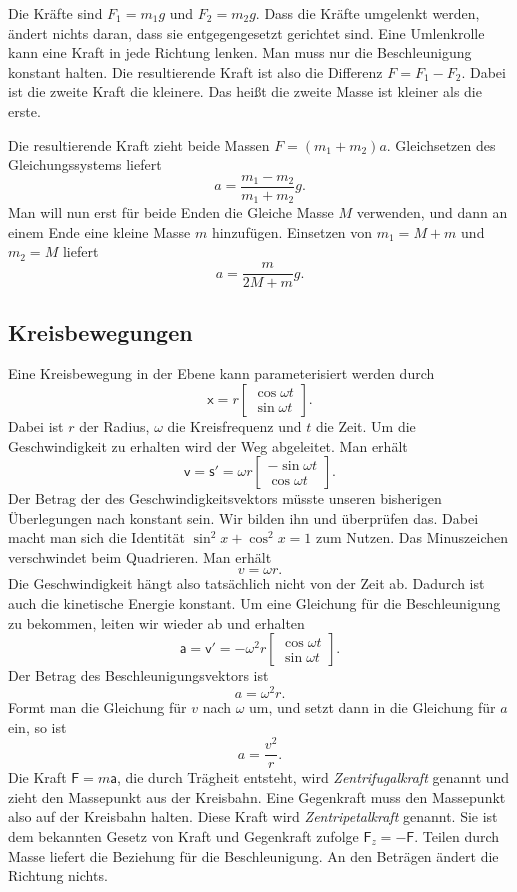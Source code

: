 \documentclass[a4paper,11pt,fleqn,twocolumn,twoside,dvipdfmx]{scrartcl}
\newcommand{\bvec}[1]{\bm{\mathsf{#1}}}
\begin{document}
Die Kräfte sind $F_1 = {m_1}g$ und $F_2 = {m_2}g$. Dass die Kräfte
umgelenkt werden, ändert nichts daran, dass sie entgegengesetzt
gerichtet sind. Eine Umlenkrolle kann eine Kraft in jede Richtung
lenken. Man muss nur die Beschleunigung konstant halten. Die
resultierende Kraft ist also die Differenz $F=F_1-F_2$.
Dabei ist die zweite Kraft die kleinere. Das heißt die zweite
Masse ist kleiner als die erste.

Die resultierende Kraft zieht beide Massen $F=(m_1+m_2)a$.
Gleichsetzen des Gleichungssystems liefert%
\[a = \frac{m_1-m_2}{m_1+m_2}g.\]
Man will nun erst für beide Enden die Gleiche Masse $M$ verwenden,
und dann an einem Ende eine kleine Masse $m$ hinzufügen. Einsetzen
von $m_1=M+m$ und $m_2=M$ liefert%
\[a = \frac{m}{2M+m} g.\]

\subsection{Kreisbewegungen}

Eine Kreisbewegung in der Ebene kann parameterisiert werden durch%
\[\bvec x = r \begin{bmatrix}
\cos\omega t\\
\sin\omega t
\end{bmatrix}.\]
Dabei ist $r$ der Radius, $\omega$ die Kreisfrequenz und $t$
die Zeit. Um die Geschwindigkeit zu erhalten wird der Weg abgeleitet.
Man erhält%
\[\bvec v = \bvec s'
= \omega r \begin{bmatrix}
-\sin\omega t\\
\cos\omega t
\end{bmatrix}.\]
Der Betrag der des Geschwindigkeitsvektors müsste unseren bisherigen
Überlegungen nach konstant sein. Wir bilden ihn und überprüfen das.
Dabei macht man sich die Identität $\sin^2 x+\cos^2 x=1$ zum Nutzen.
Das Minuszeichen verschwindet beim Quadrieren. Man erhält%
\[v = \omega r.\]
Die Geschwindigkeit hängt also tatsächlich nicht von der Zeit ab.
Dadurch ist auch die kinetische Energie konstant. Um eine Gleichung
für die Beschleunigung zu bekommen, leiten wir wieder ab und erhalten%
\[\bvec a = \bvec v' = - {\omega^2}r
\begin{bmatrix}
\cos\omega t\\
\sin\omega t\end{bmatrix}.
\]
Der Betrag des Beschleunigungsvektors ist%
\[a = {\omega^2}r.\]
Formt man die Gleichung für $v$ nach $\omega$ um, und setzt dann
in die Gleichung für $a$ ein, so ist%
\[a = \frac{v^2}{r}.\]
Die Kraft $\bvec F=m\bvec a$, die durch Trägheit entsteht,
wird \textit{Zentrifugalkraft} genannt und zieht den Massepunkt
aus der Kreisbahn. Eine Gegenkraft muss den Massepunkt also auf der
Kreisbahn halten. Diese Kraft wird \textit{Zentripetalkraft} genannt.
Sie ist dem bekannten Gesetz von Kraft und Gegenkraft zufolge
$\bvec F_z = -\bvec F$. Teilen durch Masse liefert die Beziehung
für die Beschleunigung. An den Beträgen ändert die Richtung nichts.
\end{document}
